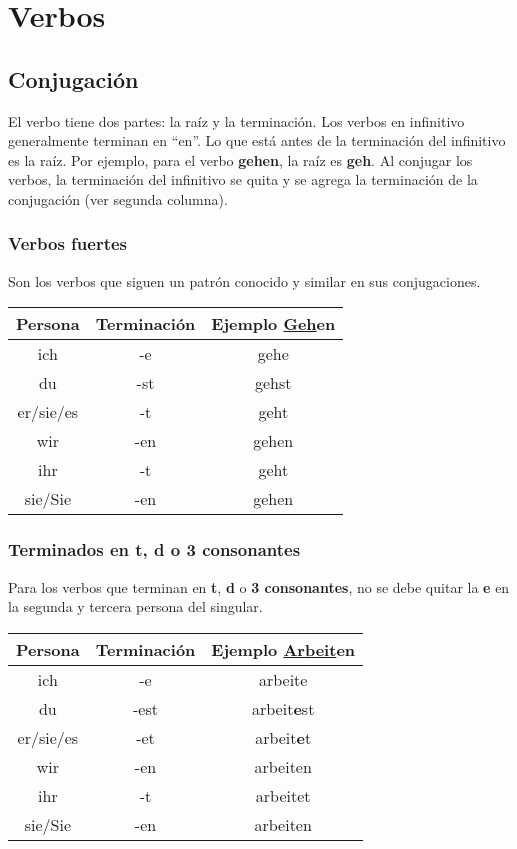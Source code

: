 \chapter{Verbos}

\section{Conjugación}
El verbo tiene dos partes: la raíz y la terminación. Los verbos en infinitivo generalmente terminan en ``en''. Lo que está antes de la terminación del infinitivo es la raíz. Por ejemplo, para el verbo \textbf{gehen}, la raíz es \textbf{geh}. Al conjugar los verbos, la terminación del infinitivo se quita y se agrega la terminación de la conjugación (ver segunda columna).

\subsection{Verbos fuertes}
Son los verbos que siguen un patrón conocido y similar en sus conjugaciones.

\begin{tabular}{|c | c c |}
\hline
\textbf{Persona} & \textbf{Terminación} & \textbf{Ejemplo \underline{Geh}en}\\
\hline
ich & -e & gehe\\
du & -st & gehst\\
er/sie/es & -t & geht\\
wir & -en & gehen\\
ihr & -t & geht \\
sie/Sie & -en & gehen \\
\hline
\end{tabular}

\subsection{Terminados en t, d o 3 consonantes}
Para los verbos que terminan en \textbf{t}, \textbf{d} o \textbf{3 consonantes}, no se debe quitar la \textbf{e} en la segunda y tercera persona del singular.

\begin{tabular}{|c | c c |}
\hline
\textbf{Persona} & \textbf{Terminación} & \textbf{Ejemplo \underline{Arbeit}en}\\
\hline
ich & -e & arbeite\\
du & -est & arbeit\textbf{e}st\\
er/sie/es & -et & arbeit\textbf{e}t \\
wir & -en & arbeiten\\
ihr & -t & arbeitet \\
sie/Sie & -en & arbeiten \\
\hline
\end{tabular}

